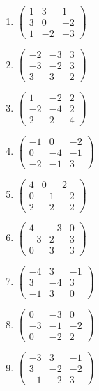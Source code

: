 \begin{enumerate}[label=\arabic*., leftmargin=*, itemsep=1pt]
\item $\left(\begin{smallmatrix}1 & 3 & 1\\ 3 & 0 & -2\\ 1 & -2 & -3\end{smallmatrix}\right)$
\item $\left(\begin{smallmatrix}-2 & -3 & 3\\ -3 & -2 & 3\\ 3 & 3 & 2\end{smallmatrix}\right)$
\item $\left(\begin{smallmatrix}1 & -2 & 2\\ -2 & -4 & 2\\ 2 & 2 & 4\end{smallmatrix}\right)$
\item $\left(\begin{smallmatrix}-1 & 0 & -2\\ 0 & -4 & -1\\ -2 & -1 & 3\end{smallmatrix}\right)$
\item $\left(\begin{smallmatrix}4 & 0 & 2\\ 0 & -1 & -2\\ 2 & -2 & -2\end{smallmatrix}\right)$
\item $\left(\begin{smallmatrix}4 & -3 & 0\\ -3 & 2 & 3\\ 0 & 3 & 3\end{smallmatrix}\right)$
\item $\left(\begin{smallmatrix}-4 & 3 & -1\\ 3 & -4 & 3\\ -1 & 3 & 0\end{smallmatrix}\right)$
\item $\left(\begin{smallmatrix}0 & -3 & 0\\ -3 & -1 & -2\\ 0 & -2 & 2\end{smallmatrix}\right)$
\item $\left(\begin{smallmatrix}-3 & 3 & -1\\ 3 & -2 & -2\\ -1 & -2 & 3\end{smallmatrix}\right)$

\end{enumerate}
